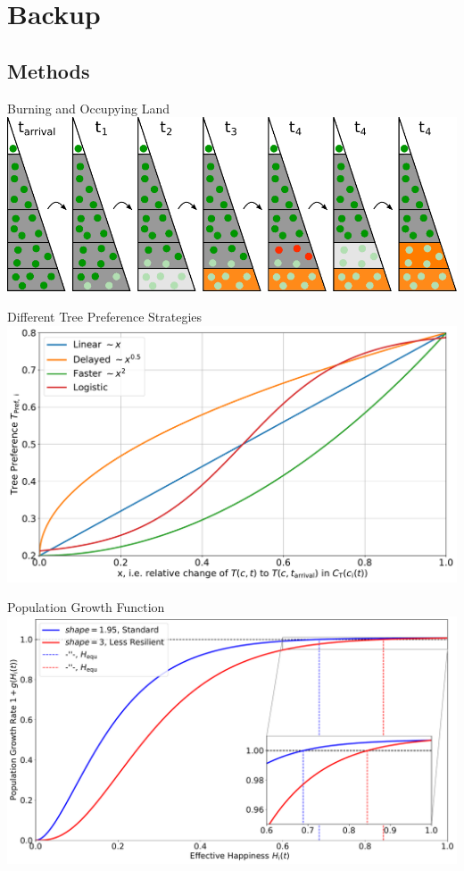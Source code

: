 


\section{Backup}
\subsection{Methods}
\begin{frame}{Burning and Occupying Land}
	\centering
	\includegraphics[width=0.7\linewidth]{../../Thesis/images/SketchABM2/burningSketch_triangle}
\end{frame}

\begin{frame}{Different Tree Preference Strategies}
	\centering
\includegraphics[width=0.7\linewidth]{../../Thesis/images/TPref}
\end{frame}

\begin{frame}{Population Growth Function}
\centering
\includegraphics[width=0.7\linewidth]{../../Thesis/images/populationchange_g}
\end{frame}

